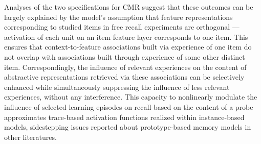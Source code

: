 {}Analyses of the two specifications for CMR suggest that these outcomes can be largely explained by the model's assumption that feature representations corresponding to studied items in free recall experiments are orthogonal --- activation of each unit on an item feature layer corresponds to one item. This ensures that context-to-feature associations built via experience of one item do not overlap with associations built through experience of some other distinct item. Correspondingly, the influence of relevant experiences on the content of abstractive representations retrieved via these associations can be selectively enhanced while simultaneously suppressing the influence of less relevant experiences, without any interference. This capacity to nonlinearly modulate the influence of selected learning episodes on recall based on the content of a probe approximates trace-based activation functions realized within instance-based models, sidestepping issues reported about prototype-based memory models in other literatures.\relax